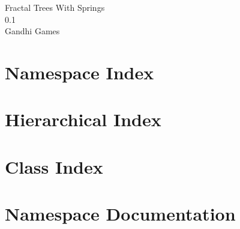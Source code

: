 \documentclass[twoside]{book}
\newcommand{\+}{\discretionary{\mbox{\scriptsize$\hookleftarrow$}}{}{}}
\newcommand{\clearemptydoublepage}{%
  \newpage{\pagestyle{empty}\cleardoublepage}%
}
\begin{document}
\hypersetup{pageanchor=false,
             bookmarksnumbered=true,
             pdfencoding=unicode
            }
\begin{titlepage}
\vspace*{7cm}
\begin{center}%
{\Large Fractal Trees With Springs \\[1ex]\large 0.\+1 }\\
\vspace*{1cm}
{\large Gandhi Games}\\
\end{center}
\end{titlepage}
\clearemptydoublepage
{}
\tableofcontents
\clearemptydoublepage
{}
\hypersetup{pageanchor=true}

\chapter{Namespace Index}

\chapter{Hierarchical Index}

\chapter{Class Index}

\chapter{Namespace Documentation}


\end{document}
